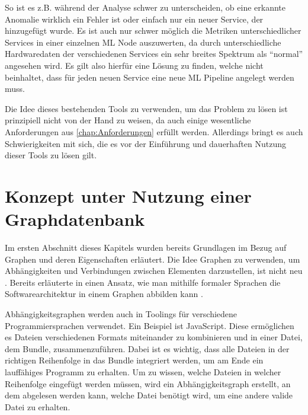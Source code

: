 \documentclass[
	12pt,
	BCOR=5mm,
	DIV=12,
	headinclude=on,
	footinclude=off,
	parskip=half,
	bibliography=totoc,
	listof=entryprefix,
	toc=listof,
	numbers=noenddot,
	plainfootsepline
]{scrreprt}
\begin{document}
So ist es z.B. während der Analyse schwer zu unterscheiden, ob eine erkannte Anomalie wirklich ein Fehler ist oder einfach nur ein neuer Service, der hinzugefügt wurde. Es ist auch nur schwer möglich die Metriken unterschiedlicher Services in einer einzelnen \ac{ML} Node auszuwerten, da durch unterschiedliche Hardwaredaten der verschiedenen Services ein sehr breites Spektrum als \enquote{normal} angesehen wird. Es gilt also hierfür eine Lösung zu finden, welche nicht beinhaltet, dass für jeden neuen Service eine neue \ac{ML} Pipeline angelegt werden muss.

Die Idee dieses bestehenden Tools zu verwenden, um das Problem zu lösen ist prinzipiell nicht von der Hand zu weisen, da auch einige wesentliche Anforderungen aus \vref{chap:Anforderungen} erfüllt werden. Allerdings bringt es auch Schwierigkeiten mit sich, die es vor der Einführung und dauerhaften Nutzung dieser Tools zu lösen gilt.

\section{Konzept unter Nutzung einer Graphdatenbank}

Im ersten Abschnitt dieses Kapitels wurden bereits Grundlagen im Bezug auf Graphen und deren Eigenschaften erläutert. Die Idee Graphen zu verwenden, um Abhängigkeiten und Verbindungen zwischen Elementen darzustellen, ist nicht neu \autocite{Ren2018}. Bereits \citeyear{Metayer1998} erläuterte \citeauthor{Metayer1998} in \textit{} einen Ansatz, wie man mithilfe formaler Sprachen die Softwarearchitektur in einem Graphen abbilden kann \autocite{Metayer1998}.

\begin{example}[Abhängigkeitsgraphen]
	Abhängigkeitsgraphen werden auch in Toolings für verschiedene Programmiersprachen verwendet. Ein Beispiel ist JavaScript. Diese ermöglichen es Dateien verschiedenen Formats miteinander zu kombinieren und in einer Datei, dem Bundle, zusammenzuführen. Dabei ist es wichtig, dass alle Dateien in der richtigen Reihenfolge in das Bundle integriert werden, um am Ende ein lauffähiges Programm zu erhalten. Um zu wissen, welche Dateien in welcher Reihenfolge eingefügt werden müssen, wird ein Abhängigkeitsgraph erstellt, an dem abgelesen werden kann, welche Datei benötigt wird, um eine andere valide Datei zu erhalten.
\end{example}
\end{document}
